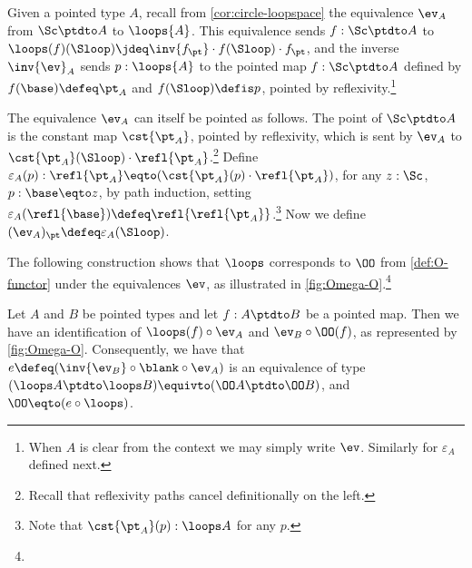 \begin{remark}\label{rem:pointing-ev}
Given a pointed type $A$, recall from \cref{cor:circle-loopspace}
the equivalence $\ev_A$ from $\Sc\ptdto A$ to $\loops{A}$.
This equivalence sends $f:\Sc\ptdto A$ to $\loops(f)(\Sloop)\jdeq
\inv{f_\pt}\cdot f(\Sloop)\cdot f_\pt$, and the
inverse $\inv{\ev}_A$ sends $p:\loops{A}$ to the pointed map
$f:\Sc\ptdto A$ defined by  $f(\base)\defeq\pt_A$ and $f(\Sloop)\defis p$,
pointed by reflexivity.\footnote{When $A$ is clear from the context 
we may simply write $\ev$. Similarly for $\varepsilon_A$ defined next.}

The equivalence $\ev_A$ can itself be
pointed as follows. The point of $\Sc\ptdto A$ is the constant map 
$\cst{\pt_A}$, pointed by reflexivity, which is sent by $\ev_A$ 
to $\cst{\pt_A}(\Sloop)\cdot \refl{\pt_A}$.\footnote{%
Recall that reflexivity paths cancel definitionally on the left.} Define 
$\varepsilon_A(p): \refl{\pt_A} \eqto (\cst{\pt_A}(p)\cdot\refl{\pt_A})$,
for any $z:\Sc$, $p:\base\eqto z$, by path induction, setting
$\varepsilon_A(\refl{\base})\defeq \refl{\refl{\pt_A}}$.\footnote{%
Note that $\cst{\pt_A}(p):\loops A$ for any $p$.} 
Now we define $(\ev_A)_\pt \defeq \varepsilon_A(\Sloop)$.
\end{remark}

The following construction shows that $\loops$
corresponds to $\OO$ from \cref{def:O-functor} under the equivalences $\ev$,
as illustrated in \cref{fig:Omega-O}.\footnote{}


\begin{marginfigure}
  \caption{\label{fig:Omega-O} $\loops(f)$ and $\protect\OO(f)$ correspond.} 
\end{marginfigure}


\begin{construction}\label{con:Omega-O}
Let $A$ and $B$ be pointed types and 
let $f: A\ptdto B$ be a pointed map.
Then we have an identification of $\loops(f)\circ \ev_A$ 
and ${\ev_B} \circ {\OO(f)}$, as represented by \cref{fig:Omega-O}.
Consequently, we have that $e\defeq(\inv{\ev_B}\circ{{\blank}\circ\ev_A})$
is an equivalence of type 
$(\loops A\ptdto\loops B)\equivto(\OO A\ptdto\OO B)$,
and $\OO \eqto (e\circ \loops)$. 
\end{construction}

